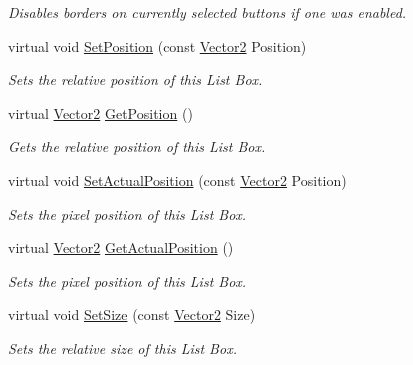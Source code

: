 \begin{DoxyCompactItemize}
\begin{DoxyCompactList}\small\item\em Disables borders on currently selected buttons if one was enabled. \item\end{DoxyCompactList}\item 
virtual void \hyperlink{classphys_1_1UI_1_1ListBox_ac7e4d02b6be093bd31f9904d6c0ef88f}{SetPosition} (const \hyperlink{classphys_1_1Vector2}{Vector2} Position)
\begin{DoxyCompactList}\small\item\em Sets the relative position of this List Box. \item\end{DoxyCompactList}\item 
virtual \hyperlink{classphys_1_1Vector2}{Vector2} \hyperlink{classphys_1_1UI_1_1ListBox_af688db0628a5588865a890584f754b02}{GetPosition} ()
\begin{DoxyCompactList}\small\item\em Gets the relative position of this List Box. \item\end{DoxyCompactList}\item 
virtual void \hyperlink{classphys_1_1UI_1_1ListBox_afa7daa798bf8702bcc3e7c4cd9dcfdf4}{SetActualPosition} (const \hyperlink{classphys_1_1Vector2}{Vector2} Position)
\begin{DoxyCompactList}\small\item\em Sets the pixel position of this List Box. \item\end{DoxyCompactList}\item 
virtual \hyperlink{classphys_1_1Vector2}{Vector2} \hyperlink{classphys_1_1UI_1_1ListBox_a44046453283fb2c54e10dc868705352a}{GetActualPosition} ()
\begin{DoxyCompactList}\small\item\em Sets the pixel position of this List Box. \item\end{DoxyCompactList}\item 
virtual void \hyperlink{classphys_1_1UI_1_1ListBox_a73f4526ffb4d35a431bb62c816257169}{SetSize} (const \hyperlink{classphys_1_1Vector2}{Vector2} Size)
\begin{DoxyCompactList}\small\item\em Sets the relative size of this List Box. \item\end{DoxyCompactList}\item 

\end{DoxyCompactItemize}
